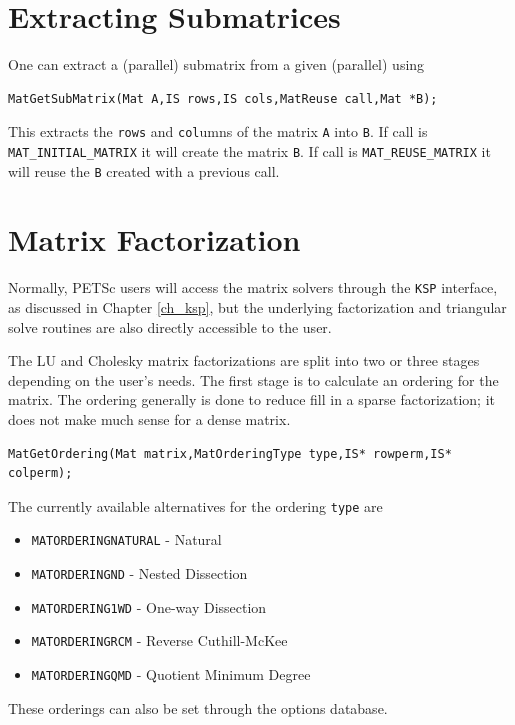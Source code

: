 {{\medskip \medskip

\section{Extracting Submatrices} 

One can extract a (parallel) submatrix from a given (parallel) using
\begin{lstlisting}
MatGetSubMatrix(Mat A,IS rows,IS cols,MatReuse call,Mat *B);
\end{lstlisting}
This extracts the \lstinline{rows} and \lstinline{col}umns of the matrix \lstinline{A} into \lstinline{B}. If
call is  \lstinline{MAT_INITIAL_MATRIX}  it will create the matrix
\lstinline{B}. If call is \lstinline{MAT_REUSE_MATRIX}  it will reuse the \lstinline{B}
created with a previous call.

\medskip \medskip

\section{Matrix Factorization} 
\label{sec_matfactor}

Normally, PETSc users will access the matrix solvers through the
\lstinline{KSP} interface, as discussed in Chapter \ref{ch_ksp}, but the underlying
factorization and triangular solve routines are also directly
accessible to the user.

\medskip \medskip

The LU and Cholesky 
matrix factorizations are split into 
two or three stages depending on the user's needs. The first stage is
to calculate an ordering for the matrix.  The ordering generally is
done to reduce fill in a sparse factorization; it does not make much
sense for a dense matrix.  
\begin{lstlisting}
MatGetOrdering(Mat matrix,MatOrderingType type,IS* rowperm,IS* colperm);
\end{lstlisting}
The currently available alternatives for the ordering \lstinline{type} are
\begin{itemize}
\item \lstinline{MATORDERINGNATURAL} - Natural
\item \lstinline{MATORDERINGND} - Nested Dissection
\item \lstinline{MATORDERING1WD} - One-way Dissection
\item \lstinline{MATORDERINGRCM} - Reverse Cuthill-McKee
\item \lstinline{MATORDERINGQMD} - Quotient Minimum Degree
\end{itemize}
These orderings can also be set through the options database.

}}
